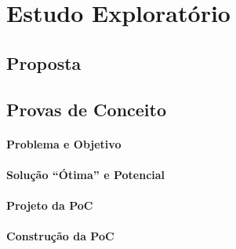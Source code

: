 \chapter{Estudo Exploratório}
\label{cap-proposta}

\section{Proposta}
\label{prop-sig}



\section{Provas de Conceito}
\label{prop-pocs}

\subsubsection*{Problema e Objetivo}

\subsubsection*{Solução ``Ótima'' e Potencial}

\subsubsection*{Projeto da PoC}

\subsubsection*{Construção da PoC}


